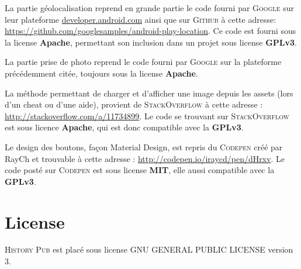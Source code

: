 \documentclass[11pt]{scrreprt}
\begin{document}
    \begin{description}[style=nextline]
        \item[EtapeActivity.java et PhotoActivity.java] La partie géolocalisation reprend en grande partie le code fourni par \textsc{Google} sur leur plateforme \url{developer.android.com} ainsi que sur \textsc{Github} à cette adresse: \url{https://github.com/googlesamples/android-play-location}. Ce code est fourni sous la license \textbf{Apache}, permettant son inclusion dans un projet sous license \textbf{GPLv3}.
        \item[PhotoActivity.java] La partie prise de photo reprend le code fourni par \textsc{Google} sur la plateforme précédemment citée, toujours sous la license \textbf{Apache}.
        \item[PhotoActivity.java] La méthode permettant de charger et d'afficher une image depuis les assets (lors d'un cheat ou d'une aide), provient de \textsc{StackOverflow} à cette adresse : \url{http://stackoverflow.com/a/11734899}. Le code se trouvant sur \textsc{StackOverflow} est sous licence \textbf{Apache}, qui est donc compatible avec la \textbf{GPLv3}.
        \item[Style.css] Le design des boutons, façon Material Design, est repris du \textsc{Codepen} créé par RayCh et trouvable à cette adresse : \url{http://codepen.io/iraycd/pen/dHrxv}. Le code posté sur \textsc{Codepen} est sous license \textbf{MIT}, elle aussi compatible avec la \textbf{GPLv3}.
    \end{description}

    \chapter{License}

    \noindent \textsc{History Pub} est placé sous license GNU GENERAL PUBLIC LICENSE version 3.
    \hfill\\
\end{document}
